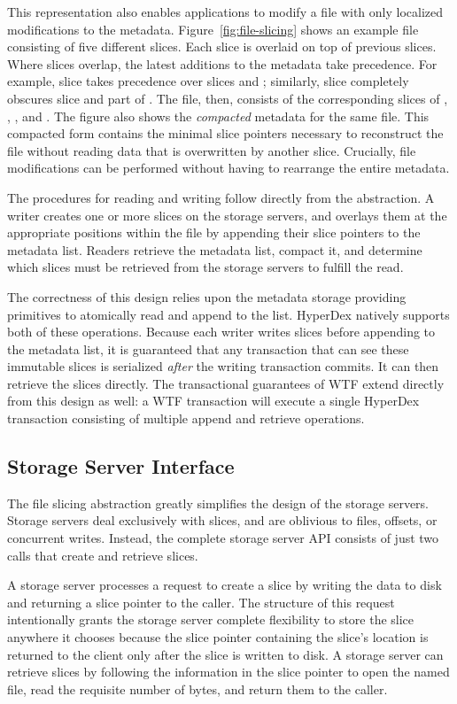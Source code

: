 \documentclass[twocolumn,10pt,letterpaper]{article}
\begin{document}
This representation also enables applications to modify a file with only
localized modifications to the metadata.  Figure~\ref{fig:file-slicing} shows an
example file consisting of five different slices.  Each slice is overlaid on top
of previous slices.  Where slices overlap, the latest additions to the metadata
take precedence.  For example, slice  takes precedence over slices  and
; similarly, slice  completely obscures slice  and part of .  The
file, then, consists of the corresponding slices of , , , and .  The
figure also shows the {\em compacted} metadata for the same file.  This
compacted form contains the minimal slice pointers necessary to reconstruct the
file without reading data that is overwritten by another slice.  Crucially, file
modifications can be performed without having to rearrange the entire metadata.

The procedures for reading and writing follow directly from the abstraction.  A
writer creates one or more slices on the storage servers, and overlays them at
the appropriate positions within the file by appending their slice pointers to
the metadata list.  Readers retrieve the metadata list, compact it, and
determine which slices must be retrieved from the storage servers to fulfill the
read.

The correctness of this design relies upon the metadata storage providing
primitives to atomically read and append to the list.  HyperDex natively
supports both of these operations.  Because each writer writes slices before
appending to the metadata list, it is guaranteed that any transaction that can
see these immutable slices is serialized {\em after} the writing transaction
commits.  It can then retrieve the slices directly.  The transactional
guarantees of WTF extend directly from this design as well:  a WTF transaction
will execute a single HyperDex transaction consisting of multiple append and
retrieve operations.

\subsection{Storage Server Interface}

The file slicing abstraction greatly simplifies the design of the storage
servers.  Storage servers deal exclusively with slices, and are oblivious to
files, offsets, or concurrent writes.  Instead, the complete storage server API
consists of just two calls that create and retrieve slices.

A storage server processes a request to create a slice by writing the data to
disk and returning a slice pointer to the caller.  The structure of this request
intentionally grants the storage server complete flexibility to store the slice
anywhere it chooses because the slice pointer containing the slice's location is
returned to the client only after the slice is written to disk.  A storage
server can retrieve slices by following the information in the slice pointer to
open the named file, read the requisite number of bytes, and return them to the
caller.
\end{document}
